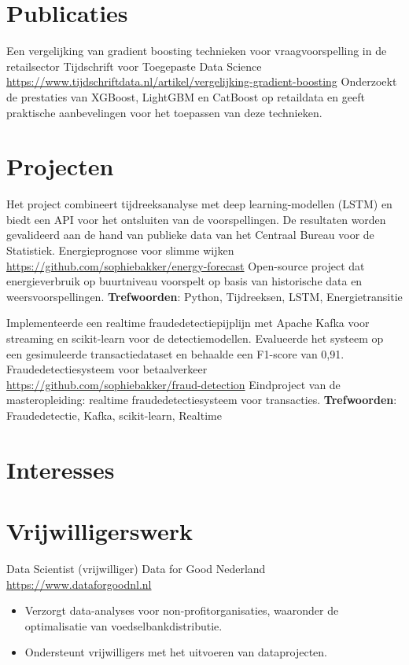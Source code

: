 \documentclass[a4paper, serif, 10pt]{moderncv}
\begin{document}
\section{Publicaties}

        {Een vergelijking van gradient boosting technieken voor vraagvoorspelling in de retailsector}
        {Tijdschrift voor Toegepaste Data Science}
        {\url{https://www.tijdschriftdata.nl/artikel/vergelijking-gradient-boosting}}
        {}
        {Onderzoekt de prestaties van XGBoost, LightGBM en CatBoost op retaildata en geeft praktische aanbevelingen voor het toepassen van deze technieken.}
\section{Projecten}

        {Het project combineert tijdreeksanalyse met deep learning-modellen (LSTM) en biedt een API voor het ontsluiten van de voorspellingen. De resultaten worden gevalideerd aan de hand van publieke data van het Centraal Bureau voor de Statistiek.
}
        {Energieprognose voor slimme wijken}
        {\url{https://github.com/sophiebakker/energy-forecast}}
        {}
        {Open-source project dat energieverbruik op buurtniveau voorspelt op basis van historische data en weersvoorspellingen.
\textbf{Trefwoorden}: Python, Tijdreeksen, LSTM, Energietransitie}

        {Implementeerde een realtime fraudedetectiepijplijn met Apache Kafka voor streaming en scikit-learn voor de detectiemodellen. Evalueerde het systeem op een gesimuleerde transactiedataset en behaalde een F1-score van 0,91.
}
        {Fraudedetectiesysteem voor betaalverkeer}
        {\url{https://github.com/sophiebakker/fraud-detection}}
        {}
        {Eindproject van de masteropleiding: realtime fraudedetectiesysteem voor transacties.
\textbf{Trefwoorden}: Fraudedetectie, Kafka, scikit-learn, Realtime}
\section{Interesses}

\section{Vrijwilligerswerk}

        {Data Scientist (vrijwilliger)}
        {Data for Good Nederland}
        {\url{https://www.dataforgoodnl.nl}}
        {}
        {\begin{itemize}
\item Verzorgt data-analyses voor non-profitorganisaties, waaronder de optimalisatie van voedselbankdistributie.
\item Ondersteunt vrijwilligers met het uitvoeren van dataprojecten.
\end{itemize}}
    
\end{document}
